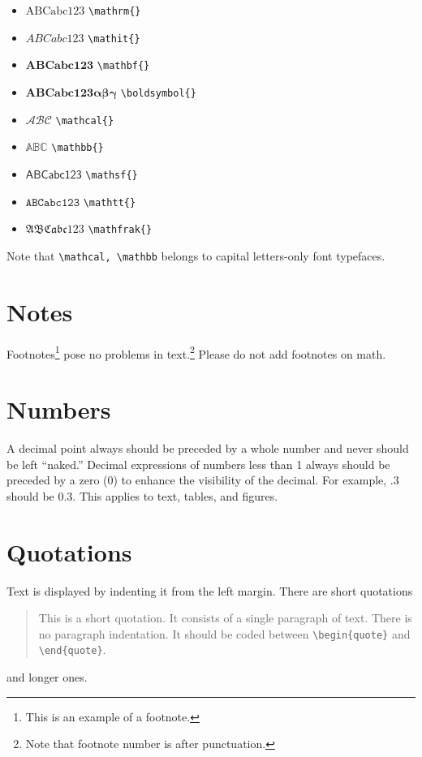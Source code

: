 \documentclass[qe,nameyear,final]{econsocart}
\begin{document}
\begin{itemize}
\item $\mathrm{ABCabc123}$ \texttt{{\textbackslash}mathrm\{\}}
\item $\mathit{ABCabc123}$ \texttt{{\textbackslash}mathit\{\}}
\item $\mathbf{ABCabc123}$ \texttt{{\textbackslash}mathbf\{\}}
\item $\boldsymbol{ABCabc123\alpha\beta\gamma}$ \texttt{{\textbackslash}boldsymbol\{\}}
\item $\mathcal{ABC}$ \texttt{{\textbackslash}mathcal\{\}}
\item $\mathbb{ABC}$ \texttt{{\textbackslash}mathbb\{\}}
\item $\mathsf{ABCabc123}$ \texttt{{\textbackslash}mathsf\{\}}
\item $\mathtt{ABCabc123}$ \texttt{{\textbackslash}mathtt\{\}}
\item $\mathfrak{ABCabc123}$ \texttt{{\textbackslash}mathfrak\{\}}
\end{itemize}

Note that \texttt{{\textbackslash}mathcal, {\textbackslash}mathbb} belongs to capital letters-only font typefaces.

\section{Notes}

Footnotes\footnote{This is an example of a footnote.}
pose no problems in text.\footnote{Note that footnote number is after punctuation.} Please do not add footnotes on math.

\section{Numbers}

A decimal point always should be preceded by a whole number and never should be left ``naked.'' Decimal expressions of numbers less than 1 always should be preceded by a zero (0) to enhance the visibility of the decimal. For example, .3 should be 0.3. This applies to text, tables, and figures.

\section{Quotations}

Text is displayed by indenting it from the left margin. There are short quotations


\begin{quote}
This is a short quotation.  It consists of a
single paragraph of text.  There is no paragraph
indentation. It should be coded between \verb|\begin{quote}| and \verb|\end{quote}|.
\end{quote}
and longer ones.
\end{document}
